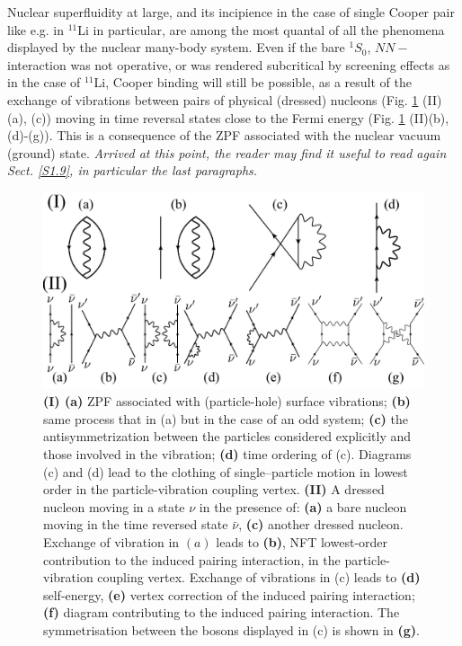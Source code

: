 \begin{subappendices}
Nuclear superfluidity at large, and its incipience in the case of single Cooper pair like e.g. in $^{11}$Li in particular, are among the most quantal of all  the phenomena displayed by the nuclear many-body 
system. Even if the bare $^1S_0$, $NN-$interaction was not operative, or was rendered subcritical by screening effects as in the case of $^{11}$Li, Cooper binding will still be possible, as a result of the exchange of vibrations between pairs of physical (dressed) nucleons (Fig. \ref{fig6G1} (II) (a), (c)) moving in time reversal states close to the Fermi energy (Fig. \ref{fig6G1} (II)(b),(d)-(g)). This is a
consequence of the ZPF associated with the  nuclear vacuum (ground) state. \textit{Arrived at this point, the reader may find it useful to read again Sect. \ref{S1.9}, in particular the last paragraphs.}
\begin{figure}
\centerline{\includegraphics[width=\textwidth]{C8/figsC8/fig6G1.pdf}}
\caption{{\bf (I) (a)} ZPF associated with (particle-hole) surface vibrations; 
{\bf (b)} same process that in (a) but in the case of an odd system; {\bf (c)} the antisymmetrization between the particles  considered explicitly and 
those involved in the vibration; {\bf (d)} time ordering of (c). 
Diagrams (c) and (d) lead to the clothing of single--particle motion  in lowest order in the 
particle-vibration coupling vertex.
{\bf (II)} A dressed  nucleon moving in a state $\nu$ in the presence of: {\bf (a)} a bare nucleon
moving in the time reversed state $\bar \nu$,
{\bf (c)} another dressed nucleon. Exchange of vibration in $(a)$ leads to {\bf (b)},  NFT 
lowest-order contribution to the induced pairing interaction, in the particle-vibration coupling vertex. Exchange 
of vibrations in {(c)}  leads to  {\bf (d)} self-energy, {\bf (e)} vertex correction of the  
induced pairing interaction;  {\bf (f)}  diagram contributing to the induced pairing interaction.
The symmetrisation between the bosons displayed in (c) is shown in {\bf (g)}.}\label{fig6G1}
\end{figure}


\end{subappendices}
